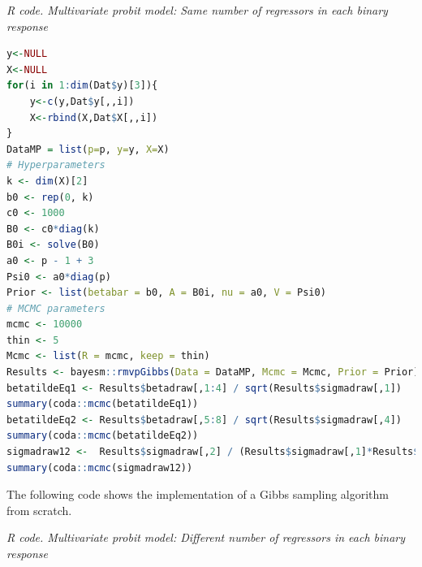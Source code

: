 \begin{enumerate}[leftmargin=*]
\begin{tcolorbox}[enhanced,width=4.67in,center upper,
	fontupper=\large\bfseries,drop shadow southwest,sharp corners]
	\textit{R code. Multivariate probit model: Same number of regressors in each binary response}
	\begin{VF}
		\begin{lstlisting}[language=R]
y<-NULL
X<-NULL
for(i in 1:dim(Dat$y)[3]){
	y<-c(y,Dat$y[,,i])
	X<-rbind(X,Dat$X[,,i])
}
DataMP = list(p=p, y=y, X=X)
# Hyperparameters
k <- dim(X)[2]
b0 <- rep(0, k)
c0 <- 1000
B0 <- c0*diag(k)
B0i <- solve(B0)
a0 <- p - 1 + 3
Psi0 <- a0*diag(p)
Prior <- list(betabar = b0, A = B0i, nu = a0, V = Psi0)
# MCMC parameters
mcmc <- 10000
thin <- 5
Mcmc <- list(R = mcmc, keep = thin)
Results <- bayesm::rmvpGibbs(Data = DataMP, Mcmc = Mcmc, Prior = Prior)
betatildeEq1 <- Results$betadraw[,1:4] / sqrt(Results$sigmadraw[,1])
summary(coda::mcmc(betatildeEq1))
betatildeEq2 <- Results$betadraw[,5:8] / sqrt(Results$sigmadraw[,4])
summary(coda::mcmc(betatildeEq2))
sigmadraw12 <-  Results$sigmadraw[,2] / (Results$sigmadraw[,1]*Results$sigmadraw[,4])^0.5
summary(coda::mcmc(sigmadraw12))
\end{lstlisting}
	\end{VF}
\end{tcolorbox}

The following code shows the implementation of a Gibbs sampling algorithm from scratch.


\begin{tcolorbox}[enhanced,width=4.67in,center upper,
	fontupper=\large\bfseries,drop shadow southwest,sharp corners]
	\textit{R code. Multivariate probit model: Different number of regressors in each binary response}
	\begin{VF}
		\begin{lstlisting}[language=R]

		\end{lstlisting}
	\end{VF}
\end{tcolorbox}



\end{enumerate}